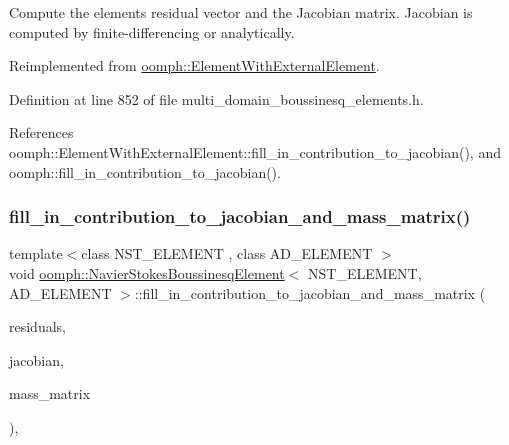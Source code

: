 Compute the element\textquotesingle{}s residual vector and the Jacobian matrix. Jacobian is computed by finite-\/differencing or analytically. 



Reimplemented from \hyperlink{classoomph_1_1ElementWithExternalElement_ae5fb09552a8271e891438f8d058ca1b8}{oomph\+::\+Element\+With\+External\+Element}.



Definition at line 852 of file multi\+\_\+domain\+\_\+boussinesq\+\_\+elements.\+h.



References oomph\+::\+Element\+With\+External\+Element\+::fill\+\_\+in\+\_\+contribution\+\_\+to\+\_\+jacobian(), and oomph\+::fill\+\_\+in\+\_\+contribution\+\_\+to\+\_\+jacobian().

\mbox{\label{classoomph_1_1NavierStokesBoussinesqElement_a6c6cc7f75f0f9d61574293648bc4f148}} 
\subsubsection{\texorpdfstring{fill\+\_\+in\+\_\+contribution\+\_\+to\+\_\+jacobian\+\_\+and\+\_\+mass\+\_\+matrix()}{fill\_in\_contribution\_to\_jacobian\_and\_mass\_matrix()}}
{\footnotesize\ttfamily template$<$class N\+S\+T\+\_\+\+E\+L\+E\+M\+E\+NT , class A\+D\+\_\+\+E\+L\+E\+M\+E\+NT $>$ \\
void \hyperlink{classoomph_1_1NavierStokesBoussinesqElement}{oomph\+::\+Navier\+Stokes\+Boussinesq\+Element}$<$ N\+S\+T\+\_\+\+E\+L\+E\+M\+E\+NT, A\+D\+\_\+\+E\+L\+E\+M\+E\+NT $>$\+::fill\+\_\+in\+\_\+contribution\+\_\+to\+\_\+jacobian\+\_\+and\+\_\+mass\+\_\+matrix (\begin{DoxyParamCaption}\item[{\hyperlink{classoomph_1_1Vector}{Vector}$<$ double $>$ \&}]{residuals,  }\item[{\hyperlink{classoomph_1_1DenseMatrix}{Dense\+Matrix}$<$ double $>$ \&}]{jacobian,  }\item[{\hyperlink{classoomph_1_1DenseMatrix}{Dense\+Matrix}$<$ double $>$ \&}]{mass\+\_\+matrix }\end{DoxyParamCaption})\hspace{0.3cm}{\ttfamily [inline]}, {\ttfamily [virtual]}}



